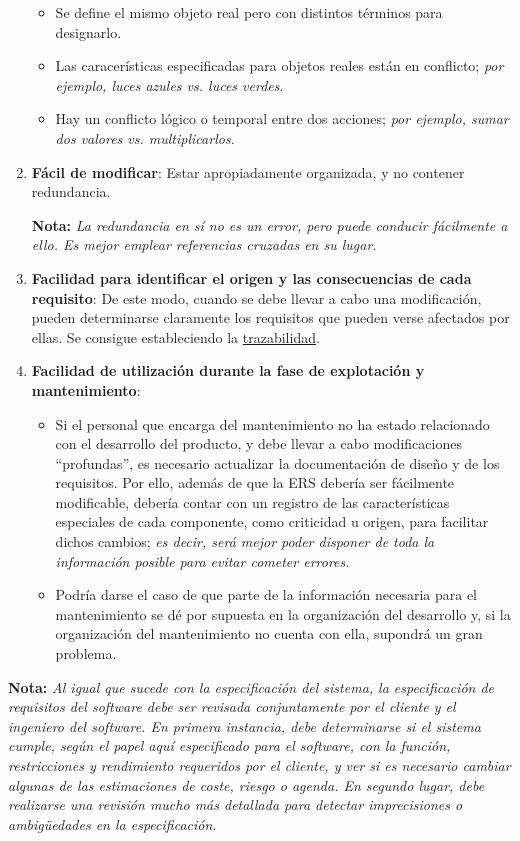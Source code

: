 \begin{enumerate}
        \begin{itemize}
            \item Se define el mismo objeto real pero con distintos términos para designarlo.
            \item Las caracerísticas especificadas para objetos reales están en conflicto; \textit{por ejemplo, luces azules vs. luces verdes}.
            \item Hay un conflicto lógico o temporal entre dos acciones; \textit{por ejemplo, sumar dos valores vs. multiplicarlos.}
        \end{itemize}
    \item \textbf{Fácil de modificar}: Estar apropiadamente organizada, y no contener redundancia.
    
    \textbf{Nota:} \textit{La redundancia en sí no es un error, pero puede conducir fácilmente a ello. Es mejor emplear referencias cruzadas en su lugar.}
    \item \textbf{Facilidad para identificar el origen y las consecuencias de cada requisito}: De este modo, cuando se debe llevar a cabo una modificación, pueden determinarse claramente los requisitos que pueden verse afectados por ellas. Se consigue estableciendo la \uline{trazabilidad}.
    \item \textbf{Facilidad de utilización durante la fase de explotación y mantenimiento}:
        \begin{itemize}
            \item Si el personal que encarga del mantenimiento no ha estado relacionado con el desarrollo del producto, y debe llevar a cabo modificaciones ``profundas'', es necesario actualizar la documentación de diseño y de los requisitos. Por ello, además de que la ERS debería ser fácilmente modificable, debería contar con un registro de las características especiales de cada componente, como criticidad u origen, para facilitar dichos cambios; \textit{es decir, será mejor poder disponer de toda la información posible para evitar cometer errores.}
            \item Podría darse el caso de que parte de la información necesaria para el mantenimiento se dé por supuesta en la organización del desarrollo y, si la organización del mantenimiento no cuenta con ella, supondrá un gran problema.
        \end{itemize}
\end{enumerate}

\textbf{Nota:} \textit{Al igual que sucede con la especificación del sistema, la especificación de requisitos del software debe ser revisada conjuntamente por el cliente y el ingeniero del software. En primera instancia, debe determinarse si el sistema cumple, según el papel aquí especificado para el software, con la función, restricciones y rendimiento requeridos por el cliente, y ver si es necesario cambiar algunas de las estimaciones de coste, riesgo o agenda. En segundo lugar, debe realizarse una revisión mucho más detallada para detectar imprecisiones o ambigüedades en la especificación.}


